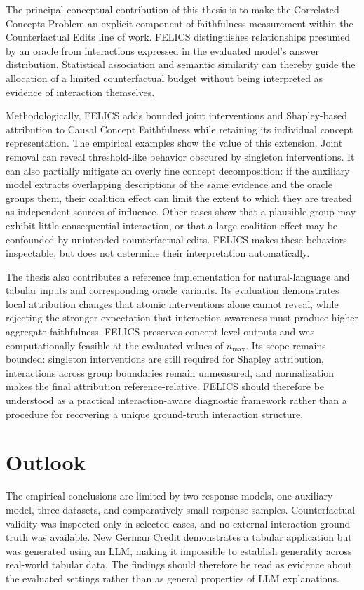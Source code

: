 The principal conceptual contribution of this thesis is to make the Correlated Concepts Problem an explicit component of faithfulness measurement within the Counterfactual Edits line of work. FELICS distinguishes relationships presumed by an oracle from interactions expressed in the evaluated model's answer distribution. Statistical association and semantic similarity can thereby guide the allocation of a limited counterfactual budget without being interpreted as evidence of interaction themselves.

Methodologically, FELICS adds bounded joint interventions and Shapley-based attribution to Causal Concept Faithfulness while retaining its individual concept representation. The empirical examples show the value of this extension. Joint removal can reveal threshold-like behavior obscured by singleton interventions. It can also partially mitigate an overly fine concept decomposition: if the auxiliary model extracts overlapping descriptions of the same evidence and the oracle groups them, their coalition effect can limit the extent to which they are treated as independent sources of influence. Other cases show that a plausible group may exhibit little consequential interaction, or that a large coalition effect may be confounded by unintended counterfactual edits. FELICS makes these behaviors inspectable, but does not determine their interpretation automatically.

The thesis also contributes a reference implementation for natural-language and tabular inputs and corresponding oracle variants. Its evaluation demonstrates local attribution changes that atomic interventions alone cannot reveal, while rejecting the stronger expectation that interaction awareness must produce higher aggregate faithfulness. FELICS preserves concept-level outputs and was computationally feasible at the evaluated values of $n_{\max}$. Its scope remains bounded: singleton interventions are still required for Shapley attribution, interactions across group boundaries remain unmeasured, and normalization makes the final attribution reference-relative. FELICS should therefore be understood as a practical interaction-aware diagnostic framework rather than a procedure for recovering a unique ground-truth interaction structure.

\section{Outlook}

The empirical conclusions are limited by two response models, one auxiliary model, three datasets, and comparatively small response samples. Counterfactual validity was inspected only in selected cases, and no external interaction ground truth was available. New German Credit demonstrates a tabular application but was generated using an LLM, making it impossible to establish generality across real-world tabular data. The findings should therefore be read as evidence about the evaluated settings rather than as general properties of LLM explanations.

